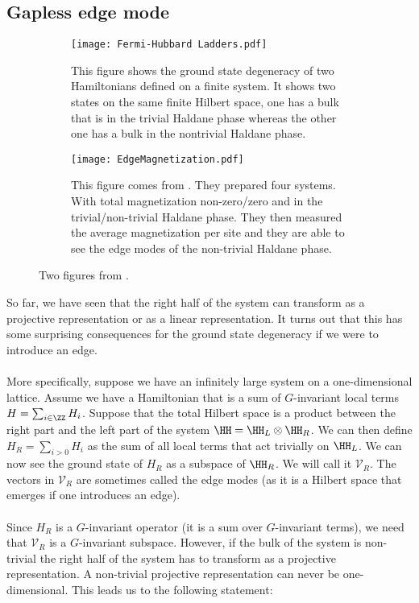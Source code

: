\subsection{Gapless edge mode}\label{sec:gapless-edge-mode}
\begin{figure}
	\begin{subfigure}[b]{0.45\textwidth}
		\centering
		\texttt{[image: Fermi-Hubbard Ladders.pdf]}
		\caption{This figure shows the ground state degeneracy of two Hamiltonians defined on a finite system. It shows two states on the same finite Hilbert space, one has a bulk that is in the trivial Haldane phase whereas the other one has a bulk in the nontrivial Haldane phase.}
		\label{fig:EdgeModesInHaldanePhase}
	\end{subfigure}
	\hfil
	\begin{subfigure}[b]{0.45\textwidth}
		\centering
		\texttt{[image: EdgeMagnetization.pdf]}
		\caption{This figure comes from \cite{sompet2022realizing}. They prepared four systems. With total magnetization non-zero/zero and in the trivial/non-trivial Haldane phase. They then measured the average magnetization per site and they are able to see the edge modes of the non-trivial Haldane phase.}
		\label{fig:EdgeMagnetization}
	\end{subfigure}
	\caption{Two figures from \cite{sompet2022realizing}.}
	\label{fig:EdgeModesInHaldanePhaseBoth}
\end{figure}
So far, we have seen that the right half of the system can transform as a projective representation or as a linear representation. It turns out that this has some surprising consequences for the ground state degeneracy if we were to introduce an edge.
\\\\
More specifically, suppose we have an infinitely large system on a one-dimensional lattice. Assume we have a Hamiltonian that is a sum of $G$-invariant local terms $H=\sum_{i\in\ZZ} H_i$. Suppose that the total Hilbert space is a product between the right part and the left part of the system $\HH=\HH_L\otimes\HH_R$. We can then define $H_R=\sum_{i>0}H_i$ as the sum of all local terms that act trivially on $\HH_L$. We can now see the ground state of $H_R$ as a subspace of $\HH_R$. We will call it $\mathcal{V}_R$. The vectors in $\mathcal{V}_R$ are sometimes called the edge modes (as it is a Hilbert space that emerges if one introduces an edge).
\\\\
Since $H_R$ is a $G$-invariant operator (it is a sum over $G$-invariant terms), we need that $\mathcal{V}_R$ is a $G$-invariant subspace. However, if the bulk of the system is non-trivial the right half of the system has to transform as a projective representation. A non-trivial projective representation can never be one-dimensional. This leads us to the following statement:
